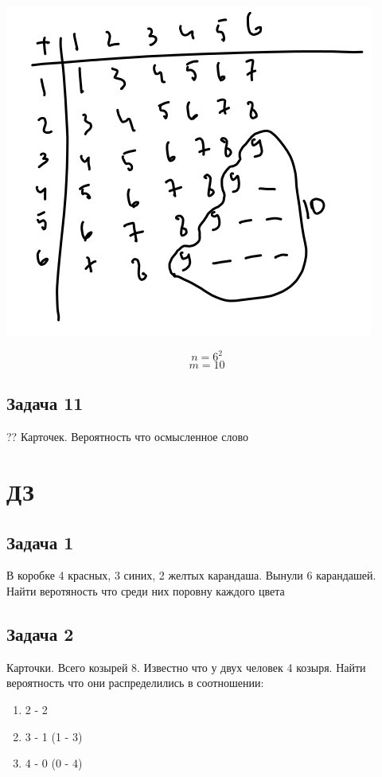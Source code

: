 \documentclass[english]{article}
\theoremstyle{plain}
\theoremstyle{remark}
\theoremstyle{definition}
\begin{document}
\begin{center}
\includegraphics[scale=0.5]{1_11.png}
\end{center}

\[ n = 6^2 \]
\[ m = 10 \]

\subsection{Задача 11}
\label{sec:org7d6ad1c}
?? Карточек. Вероятность что осмысленное слово

\section{ДЗ}
\label{sec:orgaf1aab6}
\subsection{Задача 1}
\label{sec:org9b4e7e6}
В коробке 4 красных, 3 синих, 2 желтых карандаша. Вынули 6 карандашей. Найти веротяность что среди них поровну каждого цвета
\subsection{Задача 2}
\label{sec:org5f0b86a}
Карточки. Всего козырей 8. Известно что у двух человек 4 козыря. Найти вероятность что они распределились в соотношении:
\begin{enumerate}
\item 2 - 2
\item 3 - 1 (1 - 3)
\item 4 - 0 (0 - 4)
\end{enumerate}
\end{document}
